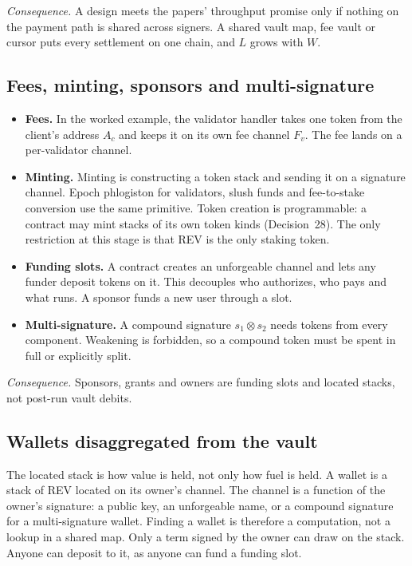 \documentclass[11pt]{article}
\begin{document}
\emph{Consequence.} A design meets the papers' throughput promise only if nothing on the payment path is shared across signers. A shared vault map, fee vault or cursor puts every settlement on one chain, and $L$ grows with $W$.

\subsection{Fees, minting, sponsors and multi-signature}

\begin{itemize}
\item \textbf{Fees.} In the worked example, the validator handler takes one token from the client's address $A_c$ and keeps it on its own fee channel $F_v$. The fee lands on a per-validator channel.
\item \textbf{Minting.} Minting is constructing a token stack and sending it on a signature channel. Epoch phlogiston for validators, slush funds and fee-to-stake conversion use the same primitive. Token creation is programmable: a contract may mint stacks of its own token kinds (Decision~28). The only restriction at this stage is that REV is the only staking token.
\item \textbf{Funding slots.} A contract creates an unforgeable channel and lets any funder deposit tokens on it. This decouples who authorizes, who pays and what runs. A sponsor funds a new user through a slot.
\item \textbf{Multi-signature.} A compound signature $s_1 \otimes s_2$ needs tokens from every component. Weakening is forbidden, so a compound token must be spent in full or explicitly split.
\end{itemize}

\emph{Consequence.} Sponsors, grants and owners are funding slots and located stacks, not post-run vault debits.

\subsection{Wallets disaggregated from the vault}

The located stack is how value is held, not only how fuel is held. A wallet is a stack of REV located on its owner's channel. The channel is a function of the owner's signature: a public key, an unforgeable name, or a compound signature for a multi-signature wallet. Finding a wallet is therefore a computation, not a lookup in a shared map. Only a term signed by the owner can draw on the stack. Anyone can deposit to it, as anyone can fund a funding slot.
\end{document}
